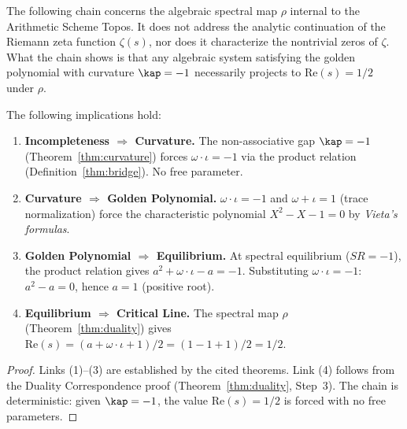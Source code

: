 \begin{remark}
The following chain concerns the algebraic spectral map $\rho$ internal to the Arithmetic Scheme Topos. It does not address the analytic continuation of the Riemann zeta function $\zeta(s)$, nor does it characterize the nontrivial zeros of $\zeta$. What the chain shows is that any algebraic system satisfying the golden polynomial with curvature $\kap = -1$ necessarily projects to $\mathrm{Re}(s) = 1/2$ under $\rho$.
\end{remark}

\begin{theorem}\label{thm:spectral-chain}
The following implications hold:
\begin{enumerate}
\item \textbf{Incompleteness $\Rightarrow$ Curvature.} The non-associative gap $\kap = -1$ (Theorem~\ref{thm:curvature}) forces $\omega \cdot \iota = -1$ via the product relation (Definition~\ref{thm:bridge}). No free parameter.
\item \textbf{Curvature $\Rightarrow$ Golden Polynomial.} $\omega \cdot \iota = -1$ and $\omega + \iota = 1$ (trace normalization) force the characteristic polynomial $X^2 - X - 1 = 0$ by \emph{Vieta's formulas}.
\item \textbf{Golden Polynomial $\Rightarrow$ Equilibrium.} At spectral equilibrium ($SR = -1$), the product relation gives $a^2 + \omega \cdot \iota - a = -1$. Substituting $\omega \cdot \iota = -1$: $a^2 - a = 0$, hence $a = 1$ (positive root).
\item \textbf{Equilibrium $\Rightarrow$ Critical Line.} The spectral map $\rho$ (Theorem~\ref{thm:duality}) gives $\mathrm{Re}(s) = (a + \omega \cdot \iota + 1)/2 = (1 - 1 + 1)/2 = 1/2$.
\end{enumerate}
\end{theorem}

\begin{proof}
Links (1)--(3) are established by the cited theorems. Link (4) follows from the Duality Correspondence proof (Theorem~\ref{thm:duality}, Step~3). The chain is deterministic: given $\kap = -1$, the value $\mathrm{Re}(s) = 1/2$ is forced with no free parameters. \qedhere
\end{proof}



